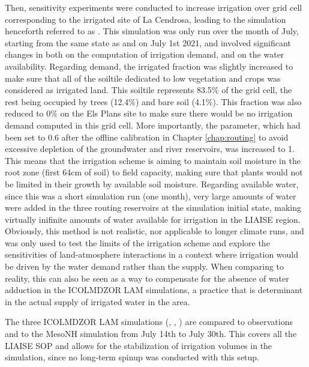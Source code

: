 Then, sensitivity experiments were conducted to increase irrigation over grid cell corresponding to the irrigated site of La Cendrosa, leading to the simulation henceforth referred to as \irrboost. This simulation was only run over the month of July, starting from the same state as \noirr and \irr on July 1st 2021, and involved significant changes in both on the computation of irrigation demand, and on the water availability. 
Regarding demand, the irrigated fraction was slightly increased to make sure that all of the soiltile dedicated to low vegetation and crops was considered as irrigated land. This soiltile represents 83.5\% of the grid cell, the rest being occupied by trees (12.4\%) and bare soil (4.1\%). This fraction was also reduced to 0\% on the Els Plans site to make sure there would be no irrigation demand computed in this grid cell.
More importantly, the \betairrig parameter, which had been set to 0.6 after the offline calibration in Chapter \ref{chap:routing} to avoid excessive depletion of the groundwater and river reservoirs, was increased to 1. This means that the irrigation scheme is aiming to maintain soil moisture in the root zone (first 64cm of soil) to field capacity, making sure that plants would not be limited in their growth by available soil moisture. 
Regarding available water, since this was a short simulation run (one month), very large amounts of water were added in the three routing reservoirs at the simulation initial state, making virtually inifinite amounts of water available for irrigation in the LIAISE region. Obviously, this method is not realistic, nor applicable to longer climate runs, and was only used to test the limits of the irrigation scheme and explore the sensitivities of land-atmosphere interactions in a context where irrigation would be driven by the water demand rather than the supply. 
When comparing to reality, this can also be seen as a way to compensate for the absence of water adduction in the ICOLMDZOR LAM simulations, a practice that is determinant in the actual supply of irrigated water in the area. %

The three ICOLMDZOR LAM simulations (\noirr, \irr, \irrboost) are compared to observations and to the MesoNH simulation from July 14th to July 30th. This covers all the LIAISE SOP and allows for the stabilization of irrigation volumes in the \irrboost simulation, since no long-term spinup was conducted with this setup.

